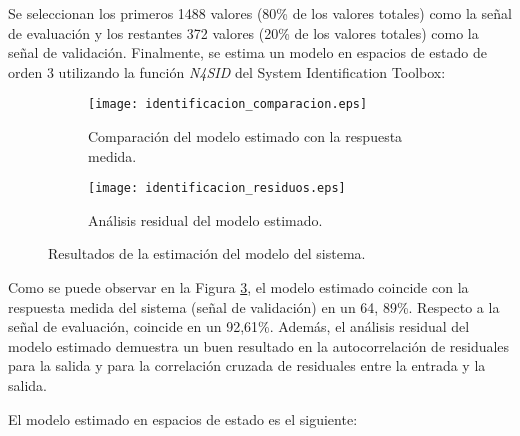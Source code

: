 Se seleccionan los primeros 1488 valores (80\% de los valores totales) como la señal de evaluación
y los restantes 372 valores (20\% de los valores totales) como la señal de validación. Finalmente,
se estima un modelo en espacios de estado de orden 3 utilizando la función \textit{N4SID} del System Identification Toolbox:

\begin{figure}[H]
    \centering

    \begin{subfigure}[b]{\textwidth}
        \centering
        \texttt{[image: identificacion\_comparacion.eps]}
        \caption{Comparación del modelo estimado con la respuesta medida.}
        \vspace{0.25cm}
        \label{fig:identificacion_comparacio n}
    \end{subfigure}
    \begin{subfigure}[b]{\textwidth}
        \centering
        \texttt{[image: identificacion\_residuos.eps]}
        \caption{Análisis residual del modelo estimado.}
        \label{fig:identificacion_residuos}
    \end{subfigure}

    \vspace{-0.25cm}
    \caption{Resultados de la estimación del modelo del sistema.}
    \label{fig:identificacion_resultados}
\end{figure}
\vspace{-0.5cm}

Como se puede observar en la Figura \ref{fig:identificacion_resultados}, el modelo estimado coincide
con la respuesta medida del sistema (señal de validación) en un 64,     89\%. Respecto a la señal de 
evaluación, coincide en un 92,61\%. Además, el análisis residual del modelo estimado
demuestra un buen resultado en la autocorrelación de residuales para la salida y para la correlación
cruzada de residuales entre la entrada y la salida.

El modelo estimado en espacios de estado es el siguiente:

